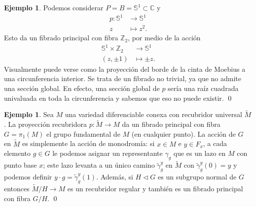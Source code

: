 \documentclass[12pt,a4paper]{article}
\theoremstyle{definition} \newtheorem{defn}[thm]{Definición}
\theoremstyle{definition} \newtheorem{ejemplo}[thm]{Ejemplo}
\theoremstyle{definition} \newtheorem{ejercicio}[thm]{Ejercicio}
\theoremstyle{remark} \newtheorem*{obs}{Observación}
\def\CC{\mathbb{C}}
\def\ZZ{\mathbb{Z}}
\def\SF{\mathbb{S}}
\begin{document}
		  \begin{ejemplo}\label{bormob}
		    Podemos considerar $P=B=\SF^1\subset \CC$ y 
		    \begin{align*}
		      p :\SF^1&\longrightarrow \SF^1\\ 
		        z &\longmapsto z^2.
		      \end{align*}
		      Esto da un fibrado principal con fibra $\ZZ_2$, por medio de la acción
		      \begin{align*}
			 \SF^1 \times \ZZ_2&\longrightarrow \SF^1\\ 
			  (z,\pm 1) &\longmapsto \pm z. 
			\end{align*}
			Visualmente puede verse como la proyección del borde de la cinta de Moebius a una circunferencia interior. Se trata de un fibrado no trivial, ya que no admite una sección global. En efecto, una sección global de $p$ sería una raíz cuadrada univaluada en toda la circunferencia y sabemos que eso no puede existir.
			\qed
		  \end{ejemplo}
		  \begin{ejemplo}
		    Sea $M$ una variedad diferenciable conexa con recubridor universal $\tilde{M}$. La proyección recubridora $p:\tilde{M}\rightarrow M$ da un fibrado principal con fibra $G=\pi_1(M)$ el grupo fundamental de $M$ (en cualquier punto). La acción de $G$ en $\tilde{M}$ es simplemente la acción de monodromía: si $x\in M$ e $y\in F_x$, a cada elemento $g\in G$ le podemos asignar un representante $\gamma_g$ que es un lazo en $M$ con punto base $x$; este lazo levanta a un único camino $\tilde{\gamma}^y_g$ en $\tilde{M}$ con $\tilde{\gamma}^y_g(0)=y$ y podemos definir $y\cdot g=\tilde{\gamma}^y_g(1)$. Además, si $H\lhd G$ es un subgrupo normal de $G$ entonces $\tilde{M}/H\rightarrow M$ es un recubridor regular y también es un fibrado principal con fibra $G/H$.
		  \qed
		  \end{ejemplo}
\end{document}
